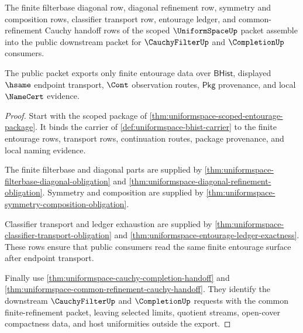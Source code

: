 \begin{theorem}
\label{thm:uniformspace-entourage-public-export}
The finite filterbase diagonal row, diagonal refinement row, symmetry and
composition rows, classifier transport row, entourage ledger, and
common-refinement Cauchy handoff rows of the scoped $\UniformSpaceUp$ packet
assemble into the public downstream packet for $\CauchyFilterUp$ and
$\CompletionUp$ consumers.

The public packet exports only finite entourage data over $\mathsf{BHist}$,
displayed $\hsame$ endpoint transport, $\Cont$ observation routes,
$\mathsf{Pkg}$ provenance, and local $\NameCert$ evidence.
\end{theorem}
\begin{proof}
Start with the scoped package of
\autoref{thm:uniformspace-scoped-entourage-package}. It binds the carrier of
\autoref{def:uniformspace-bhist-carrier} to the finite entourage rows,
transport rows, continuation routes, package provenance, and local naming
evidence.

The finite filterbase and diagonal parts are supplied by
\autoref{thm:uniformspace-filterbase-diagonal-obligation} and
\autoref{thm:uniformspace-diagonal-refinement-obligation}. Symmetry and
composition are supplied by
\autoref{thm:uniformspace-symmetry-composition-obligation}.

Classifier transport and ledger exhaustion are supplied by
\autoref{thm:uniformspace-classifier-transport-obligation} and
\autoref{thm:uniformspace-entourage-ledger-exactness}. These rows ensure
that public consumers read the same finite entourage surface after endpoint
transport.

Finally use \autoref{thm:uniformspace-cauchy-completion-handoff} and
\autoref{thm:uniformspace-common-refinement-cauchy-handoff}. They identify
the downstream $\CauchyFilterUp$ and $\CompletionUp$ requests with the common
finite-refinement packet, leaving selected limits, quotient streams,
open-cover compactness data, and host uniformities outside the export.
\end{proof}

